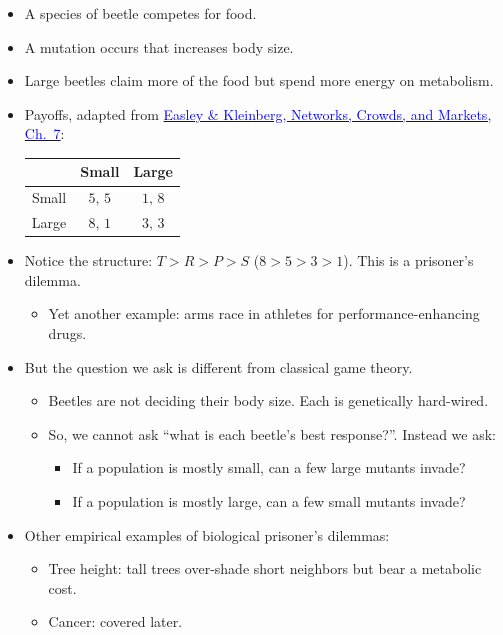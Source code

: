 \documentclass[20pt]{extarticle}
\newcommand{\hrefc}[2]{\href{#1}{\textcolor{blue}{#2}}}
\begin{document}
\begin{itemize}
\item A species of beetle competes for food.
\item A mutation occurs that increases body size.
\item Large beetles claim more of the food but spend more energy on metabolism.
\item Payoffs, adapted from \hrefc{https://www.cs.cornell.edu/home/kleinber/networks-book/networks-book.pdf}{Easley \& Kleinberg, Networks, Crowds, and Markets, Ch.~7}:
\begin{center}
\begin{tabular}{|c||c|c|}
\hline
 & Small & Large \\
\hline\hline
Small & $5,\,5$ & $1,\,8$ \\
\hline
Large & $8,\,1$ & $3,\,3$ \\
\hline
\end{tabular}
\end{center}

\item Notice the structure: $T>R>P>S$ ($8>5>3>1$). This is a prisoner's dilemma.
	\begin{itemize}
	\item Yet another example: arms race in athletes for performance-enhancing drugs.
	\end{itemize}
\item But the question we ask is different from classical game theory.
	\begin{itemize}
	\item Beetles are not deciding their body size. Each is genetically hard-wired.
	\item So, we cannot ask ``what is each beetle's best response?''. Instead we ask:
		\begin{itemize}
		\item If a population is mostly small, can a few large mutants invade?
		\item If a population is mostly large, can a few small mutants invade?
		\end{itemize}
	\end{itemize}
\item Other empirical examples of biological prisoner's dilemmas:
	\begin{itemize}
	\item Tree height: tall trees over-shade short neighbors but bear a metabolic cost.
	\item Cancer: covered later.
	\end{itemize}
\end{itemize}
\end{document}
